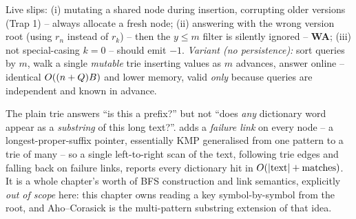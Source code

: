 
\begin{warningbox}
Live slips: (i) mutating a shared node during insertion, corrupting older versions (Trap 1) -- always
allocate a fresh node; (ii) answering with the wrong version root (using $r_n$ instead of $r_k$) -- then
the $y\le m$ filter is silently ignored -- \textbf{WA}; (iii) not special-casing $k=0$ -- should emit $-1$.
\emph{Variant (no persistence):} sort queries by $m$, walk a single \emph{mutable} trie inserting values
as $m$ advances, answer online -- identical $O((n+Q)B)$ and lower memory, valid \emph{only} because
queries are independent and known in advance.
\end{warningbox}

\begin{notebox}
The plain trie answers ``is this a prefix?'' but not ``does \emph{any} dictionary word appear as a
\emph{substring} of this long text?''.  adds a \emph{failure link} on every node -- a
longest-proper-suffix pointer, essentially KMP generalised from one pattern to a trie of many -- so a
single left-to-right scan of the text, following trie edges and falling back on failure links, reports
every dictionary hit in $O(|\text{text}| + \text{matches})$. It is a whole chapter's worth of BFS
construction and link semantics, explicitly \emph{out of scope} here: this chapter owns reading a key
symbol-by-symbol from the root, and Aho--Corasick is the multi-pattern substring extension of that idea.
\end{notebox}

